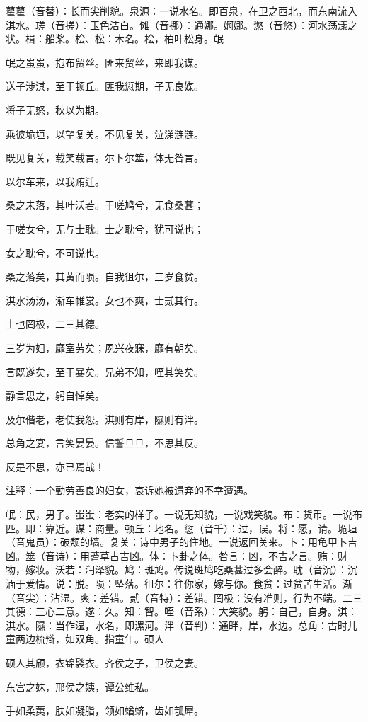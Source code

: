 \documentclass[12pt,UTF8]{ctexbook}
\begin{document}
藋藋（音替）：长而尖削貌。泉源：一说水名。即百泉，在卫之西北，而东南流入淇水。瑳（音搓）：玉色洁白。傩（音挪）：通娜。婀娜。滺（音悠）：河水荡漾之状。楫：船桨。桧、松：木名。桧，柏叶松身。氓

氓之蚩蚩，抱布贸丝。匪来贸丝，来即我谋。

送子涉淇，至于顿丘。匪我愆期，子无良媒。

将子无怒，秋以为期。

乘彼垝垣，以望复关。不见复关，泣涕涟涟。

既见复关，载笑载言。尔卜尔筮，体无咎言。

以尔车来，以我贿迁。

桑之未落，其叶沃若。于嗟鸠兮，无食桑葚；

于嗟女兮，无与士耽。士之耽兮，犹可说也；

女之耽兮，不可说也。

桑之落矣，其黄而陨。自我徂尔，三岁食贫。

淇水汤汤，渐车帷裳。女也不爽，士贰其行。

士也罔极，二三其德。

三岁为妇，靡室劳矣；夙兴夜寐，靡有朝矣。

言既遂矣，至于暴矣。兄弟不知，咥其笑矣。

静言思之，躬自悼矣。

及尔偕老，老使我怨。淇则有岸，隰则有泮。

总角之宴，言笑晏晏。信誓旦旦，不思其反。

反是不思，亦已焉哉！

注释：一个勤劳善良的妇女，哀诉她被遗弃的不幸遭遇。

氓：民，男子。蚩蚩：老实的样子。一说无知貌，一说戏笑貌。布：货币。一说布匹。即：靠近。谋：商量。顿丘：地名。愆（音千）：过，误。将：愿，请。垝垣（音鬼员）：破颓的墙。复关：诗中男子的住地。一说返回关来。卜：用龟甲卜吉凶。筮（音诗）：用蓍草占吉凶。体：卜卦之体。咎言：凶，不吉之言。贿：财物，嫁妆。沃若：润泽貌。鸠：斑鸠。传说斑鸠吃桑葚过多会醉。耽（音沉）：沉湎于爱情。说：脱。陨：坠落。徂尔：往你家，嫁与你。食贫：过贫苦生活。渐（音尖）：沾湿。爽：差错。贰（音特）：差错。罔极：没有准则，行为不端。二三其德：三心二意。遂：久。知：智。咥（音系）：大笑貌。躬：自己，自身。淇：淇水。隰：当作湿，水名，即漯河。泮（音判）：通畔，岸，水边。总角：古时儿童两边梳辫，如双角。指童年。硕人

硕人其颀，衣锦褧衣。齐侯之子，卫侯之妻。

东宫之妹，邢侯之姨，谭公维私。

手如柔荑，肤如凝脂，领如蝤蛴，齿如瓠犀。
\end{document}
